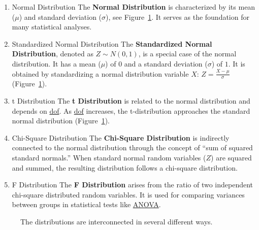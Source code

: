\documentclass[
  a4paper,
]{scrbook}
\begin{document}
\begin{enumerate}
\def\labelenumi{\arabic{enumi}.}
\item
  Normal Distribution The \textbf{Normal Distribution} is characterized
  by its mean (\(\mu\)) and standard deviation (\(\sigma\)), see
  Figure~\ref{fig-interconnections}. It serves as the foundation for
  many statistical analyses.
\item
  Standardized Normal Distribution The \textbf{Standardized Normal
  Distribution}, denoted as \(Z \sim N(0, 1)\), is a special case of the
  normal distribution. It has a mean (\(\mu\)) of \(0\) and a standard
  deviation (\(\sigma\)) of \(1\). It is obtained by standardizing a
  normal distribution variable \(X\): \(Z = \frac{X - \mu}{\sigma}\)
  (Figure~\ref{fig-interconnections}).
\item
  t Distribution The \textbf{t Distribution} is related to the normal
  distribution and depends on \hyperref[acronyms_dof]{dof}. As
  \hyperref[acronyms_dof]{dof} increases, the t-distribution approaches
  the standard normal distribution (Figure~\ref{fig-interconnections}).
\item
  Chi-Square Distribution The \textbf{Chi-Square Distribution} is
  indirectly connected to the normal distribution through the concept of
  ``sum of squared standard normals.'' When standard normal random
  variables (\(Z\)) are squared and summed, the resulting distribution
  follows a chi-square distribution.
\item
  F Distribution The \textbf{F Distribution} arises from the ratio of
  two independent chi-square distributed random variables. It is used
  for comparing variances between groups in statistical tests like
  \hyperref[acronyms_ANOVA]{ANOVA}.
\end{enumerate}

\begin{figure}[H]


\caption{\label{fig-interconnections}The distributions are
interconnected in several different ways.}

\end{figure}%
\end{document}
